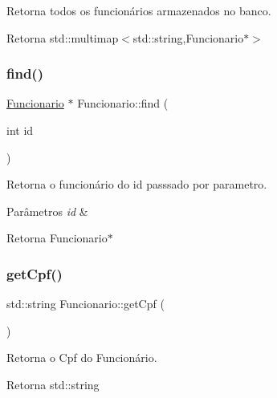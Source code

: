 Retorna todos os funcionários armazenados no banco. 

\begin{DoxyReturn}{Retorna}
std\+::multimap$<$std\+::string,\+Funcionario$\ast$$>$ 
\end{DoxyReturn}
\mbox{\label{classFuncionario_ad08fef8edac1497d827d39e081f1e7bb}} 
\subsubsection{\texorpdfstring{find()}{find()}}
{\footnotesize\ttfamily \hyperlink{classFuncionario}{Funcionario} $\ast$ Funcionario\+::find (\begin{DoxyParamCaption}\item[{int}]{id }\end{DoxyParamCaption})\hspace{0.3cm}{\ttfamily [static]}}



Retorna o funcionário do id passsado por parametro. 


\begin{DoxyParams}{Parâmetros}
{\em id} & \\
\hline
\end{DoxyParams}
\begin{DoxyReturn}{Retorna}
Funcionario$\ast$ 
\end{DoxyReturn}
\mbox{\label{classFuncionario_aad99a1c5373c00bf5ad161aad1b18a4f}} 
\subsubsection{\texorpdfstring{get\+Cpf()}{getCpf()}}
{\footnotesize\ttfamily std\+::string Funcionario\+::get\+Cpf (\begin{DoxyParamCaption}{ }\end{DoxyParamCaption})}



Retorna o Cpf do Funcionário. 

\begin{DoxyReturn}{Retorna}
std\+::string 
\end{DoxyReturn}
\mbox{\label{classFuncionario_a98b261893ff916049db28530d3ba1160}} 

